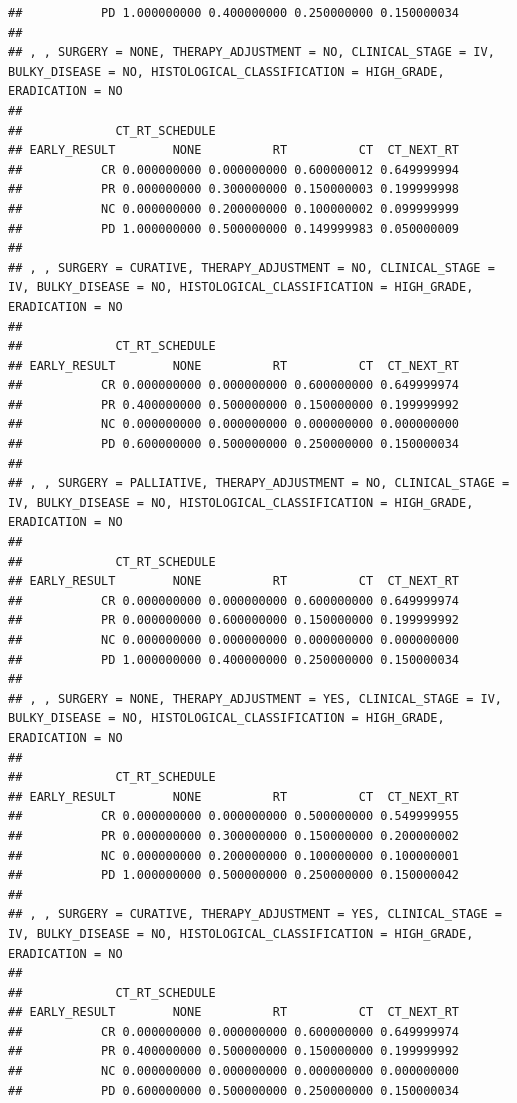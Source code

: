 \documentclass[]{article}
\begin{document}
\begin{verbatim}
##           PD 1.000000000 0.400000000 0.250000000 0.150000034
## 
## , , SURGERY = NONE, THERAPY_ADJUSTMENT = NO, CLINICAL_STAGE = IV, BULKY_DISEASE = NO, HISTOLOGICAL_CLASSIFICATION = HIGH_GRADE, ERADICATION = NO
## 
##             CT_RT_SCHEDULE
## EARLY_RESULT        NONE          RT          CT  CT_NEXT_RT
##           CR 0.000000000 0.000000000 0.600000012 0.649999994
##           PR 0.000000000 0.300000000 0.150000003 0.199999998
##           NC 0.000000000 0.200000000 0.100000002 0.099999999
##           PD 1.000000000 0.500000000 0.149999983 0.050000009
## 
## , , SURGERY = CURATIVE, THERAPY_ADJUSTMENT = NO, CLINICAL_STAGE = IV, BULKY_DISEASE = NO, HISTOLOGICAL_CLASSIFICATION = HIGH_GRADE, ERADICATION = NO
## 
##             CT_RT_SCHEDULE
## EARLY_RESULT        NONE          RT          CT  CT_NEXT_RT
##           CR 0.000000000 0.000000000 0.600000000 0.649999974
##           PR 0.400000000 0.500000000 0.150000000 0.199999992
##           NC 0.000000000 0.000000000 0.000000000 0.000000000
##           PD 0.600000000 0.500000000 0.250000000 0.150000034
## 
## , , SURGERY = PALLIATIVE, THERAPY_ADJUSTMENT = NO, CLINICAL_STAGE = IV, BULKY_DISEASE = NO, HISTOLOGICAL_CLASSIFICATION = HIGH_GRADE, ERADICATION = NO
## 
##             CT_RT_SCHEDULE
## EARLY_RESULT        NONE          RT          CT  CT_NEXT_RT
##           CR 0.000000000 0.000000000 0.600000000 0.649999974
##           PR 0.000000000 0.600000000 0.150000000 0.199999992
##           NC 0.000000000 0.000000000 0.000000000 0.000000000
##           PD 1.000000000 0.400000000 0.250000000 0.150000034
## 
## , , SURGERY = NONE, THERAPY_ADJUSTMENT = YES, CLINICAL_STAGE = IV, BULKY_DISEASE = NO, HISTOLOGICAL_CLASSIFICATION = HIGH_GRADE, ERADICATION = NO
## 
##             CT_RT_SCHEDULE
## EARLY_RESULT        NONE          RT          CT  CT_NEXT_RT
##           CR 0.000000000 0.000000000 0.500000000 0.549999955
##           PR 0.000000000 0.300000000 0.150000000 0.200000002
##           NC 0.000000000 0.200000000 0.100000000 0.100000001
##           PD 1.000000000 0.500000000 0.250000000 0.150000042
## 
## , , SURGERY = CURATIVE, THERAPY_ADJUSTMENT = YES, CLINICAL_STAGE = IV, BULKY_DISEASE = NO, HISTOLOGICAL_CLASSIFICATION = HIGH_GRADE, ERADICATION = NO
## 
##             CT_RT_SCHEDULE
## EARLY_RESULT        NONE          RT          CT  CT_NEXT_RT
##           CR 0.000000000 0.000000000 0.600000000 0.649999974
##           PR 0.400000000 0.500000000 0.150000000 0.199999992
##           NC 0.000000000 0.000000000 0.000000000 0.000000000
##           PD 0.600000000 0.500000000 0.250000000 0.150000034

\end{verbatim}
\end{document}
